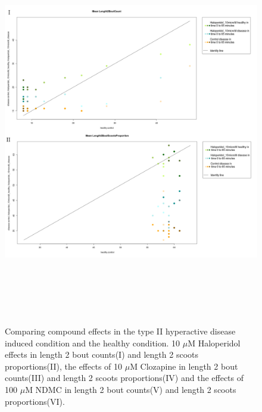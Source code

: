\newpage
\begin{figure}[h!]
\begin{center}
\caption{Comparing compound effects in the type II hyperactive disease induced condition and the healthy condition. 10 $\mu$M Haloperidol effects in length 2 bout counts(I) and length 2 scoots proportions(II), the effects of 10 $\mu$M Clozapine in length 2 bout counts(III) and length 2 scoots proportions(IV) and the effects of 100 $\mu$M NDMC in length 2 bout counts(V) and length 2 scoots proportions(VI).}
\includegraphics[width=15cm,height=17cm]{PTZCountScootsH.png}
\end{center}
\end{figure}
\newpage
